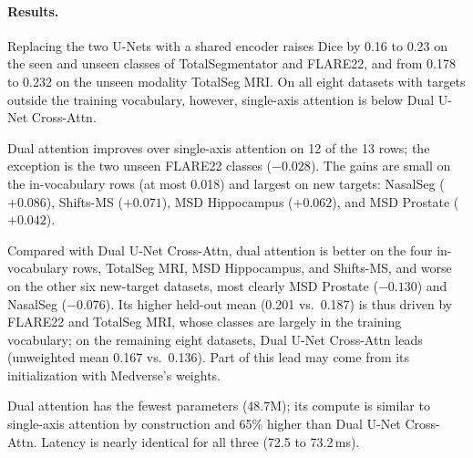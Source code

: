 \paragraph{Results.}
Replacing the two U-Nets with a shared encoder raises Dice by 0.16 to 0.23 on
the seen and unseen classes of TotalSegmentator and FLARE22, and from 0.178 to
0.232 on the unseen modality TotalSeg MRI. On all eight datasets with targets
outside the training vocabulary, however, single-axis attention is below Dual
U-Net Cross-Attn.

Dual attention improves over single-axis attention on 12 of the 13 rows; the
exception is the two unseen FLARE22 classes ($-0.028$). The gains are small on
the in-vocabulary rows (at most 0.018) and largest on new targets: NasalSeg
($+0.086$), Shifts-MS ($+0.071$), MSD Hippocampus ($+0.062$), and MSD Prostate
($+0.042$).

Compared with Dual U-Net Cross-Attn, dual attention is better on the four
in-vocabulary rows, TotalSeg MRI, MSD Hippocampus, and Shifts-MS, and worse on
the other six new-target datasets, most clearly MSD Prostate ($-0.130$) and
NasalSeg ($-0.076$). Its higher held-out mean (0.201 vs.\ 0.187) is thus
driven by FLARE22 and TotalSeg MRI, whose classes are largely in the training
vocabulary; on the remaining eight datasets, Dual U-Net Cross-Attn leads
(unweighted mean 0.167 vs.\ 0.136). Part of this lead may come from its
initialization with Medverse's weights.

Dual attention has the fewest parameters (48.7M); its compute is similar to
single-axis attention by construction and 65\% higher than Dual U-Net
Cross-Attn. Latency is nearly identical for all three (72.5 to 73.2\,ms).